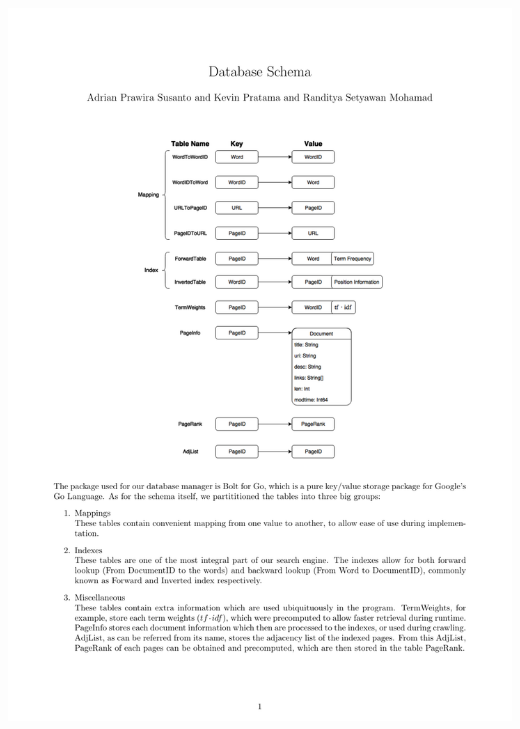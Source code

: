 \documentclass[11pt,a4paper]{article}
\begin{document}
    \begin{center}
        \includegraphics[scale=0.8]{databaseSchema} \\[2\baselineskip]
    \end{center}
\end{document}
